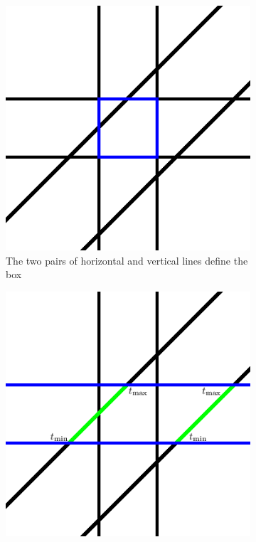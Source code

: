 \documentclass{article}
\begin{document}
\begin{figure}[h]
	\centering
	\begin{subfigure}[t]{0.21\linewidth}
		\includegraphics[width=\linewidth]{aabb1}
		\caption{The two pairs of horizontal and vertical lines define the box}
		\label{fig:aabb1}
	\end{subfigure}
\hfill
	\begin{subfigure}[t]{0.21\linewidth}
		\includegraphics[width=\linewidth]{aabb2}

\end{subfigure}
\end{figure}
\end{document}
